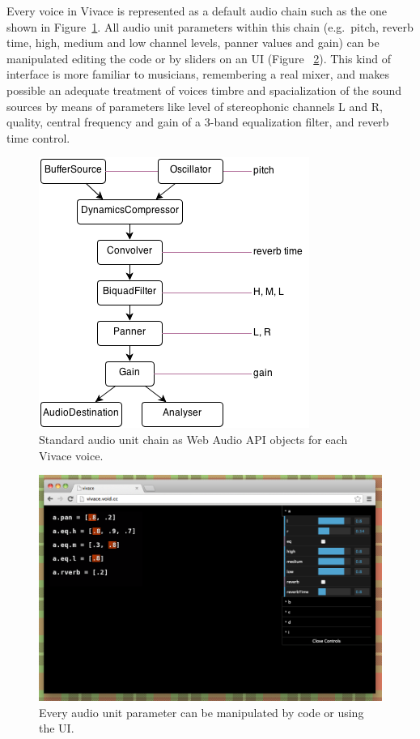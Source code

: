 \documentclass[letterpaper, 12pt]{article}
\begin{document}
Every voice in Vivace is represented as a default audio chain such as
the one shown in Figure~\ref{fig:chain}. All audio unit parameters
within this chain (e.g.\ pitch, reverb time, high, medium and low
channel levels, panner values and gain) can be manipulated editing the
code or by sliders on an UI (Figure ~\ref{fig:ui}). This kind of
interface is more familiar to musicians, remembering a real mixer, and
makes possible an adequate treatment of voices timbre and
spacialization of the sound sources by means of parameters like level
of stereophonic channels L and R, quality, central frequency and gain
of a 3-band equalization filter, and reverb time control.

\begin{figure}[htpb]
  \begin{center}
    \includegraphics[scale=.5]{img/fig_chain.png}
    \caption{Standard audio unit chain as Web Audio API objects for
      each Vivace voice.}
    \label{fig:chain}
  \end{center}
\end{figure}

\begin{figure}[htpb]
  \begin{center}
    \includegraphics[scale=.3]{img/fig_ui.png}
    \caption{Every audio unit parameter can be manipulated by code or
      using the UI.}
    \label{fig:ui}
  \end{center}
\end{figure}
\end{document}
